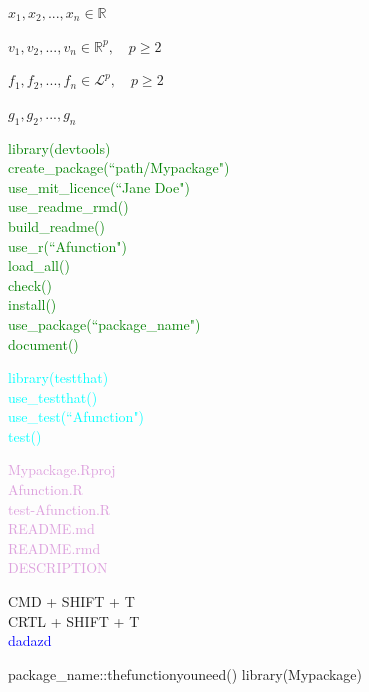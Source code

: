 \documentclass{article}
\begin{document}
\newpage

$x_1,  x_2, ... , x_n \in \mathbb{R}$

 \vspace{0.8cm}
 
 $v_1,  v_2, ... , v_n \in \mathbb{R}^p,  \quad p \geq 2$
 
  \vspace{0.8cm}
  
  $f_1,  f_2, ... , f_n \in \mathcal{L}^p,  \quad p \geq 2$
  
   \vspace{0.8cm}
   
   $g_1,  g_2, ... , g_n$
   \vspace{0.8cm}
      
 \textcolor{Green}{library(devtools)\\
 create\_package(“path/Mypackage")\\
 use\_mit\_licence(“Jane Doe")\\
 use\_readme\_rmd()\\
 build\_readme()\\
 use\_r(“Afunction")\\
 load\_all()\\
 check()\\
 install()\\
  use\_package(“package\_name")\\
  document()\\
 }      
 
      
         \vspace{0.8cm}
         
          \textcolor{Cyan}{library(testthat)\\
 use\_testthat()\\
 use\_test(“Afunction")\\
 test()
 }
         
            \vspace{0.8cm}
   
             \textcolor{Plum}{
Mypackage.Rproj \\         
Afunction.R \\
test-Afunction.R \\
README.md \\
README.rmd \\
DESCRIPTION
 }
 
 CMD + SHIFT + T\\
 CRTL + SHIFT + T\\
 
        \textcolor{Blue}{dadazd}
        
        package\_name::thefunctionyouneed()
        library(Mypackage)
\end{document}
